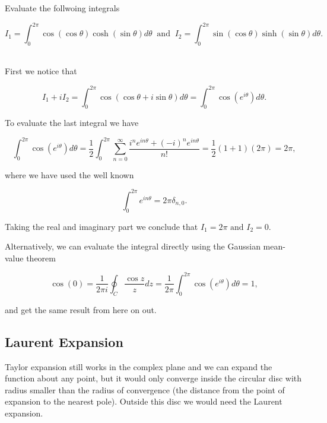 \documentclass[english,a4paper,12pt]{report}
\begin{document}
{Evaluate the follwoing integrals

\begin{equation}
    I_1 = \int_{0}^{2\pi } \cos (\cos \theta ) \cosh (\sin \theta ) d \theta ~\text { and }~ I_2 = \int_{0}^{2\pi } \sin (\cos \theta ) \sinh (\sin \theta ) d \theta .   
\end{equation}
~
}
{First we notice that 

\begin{equation}
    I_1 + iI_2 = \int_{0}^{2\pi } \cos (\cos \theta + i \sin \theta ) d \theta = \int_{0}^{2\pi } \cos (e^{i \theta } ) d \theta .    
\end{equation}

To evaluate the last integral we have 

\begin{equation}
    \int_{0}^{2\pi } \cos (e^{i \theta } ) d \theta = \frac{1}{2} \int_{0}^{2\pi } \sum_{n=0}^{\infty} \frac{i ^{n} e^{i n \theta } + (-i)^{n} e^{i n \theta }}{n!} = \frac{1}{2} (1+1) (2\pi ) = 2\pi ,     
\end{equation}

where we have used the well known 

\begin{equation}
    \int_{0}^{2\pi } e^{in \theta } = 2\pi \delta _{n,0}.   
\end{equation}

Taking the real and imaginary part we conclude that \(I_1 = 2\pi \text { and } I_2 = 0\).

Alternatively, we can evaluate the integral directly using the Gaussian mean-value theorem

\begin{equation}
    \cos (0) = \frac{1}{2\pi i} \oint_{C} \frac{\cos z}{z}dz = \frac{1}{2\pi } \int_{0}^{2\pi } \cos (e^{i \theta } ) d \theta = 1,
\end{equation}

and get the same result from here on out.
} 



\subsection{Laurent Expansion}

Taylor expansion still works in the complex plane and we can expand the function about any point, but it would only converge inside the circular disc with radius smaller than the radius of convergence (the distance from the point of expansion to the nearest pole). Outside this disc we would need the Laurent expansion.
\end{document}
